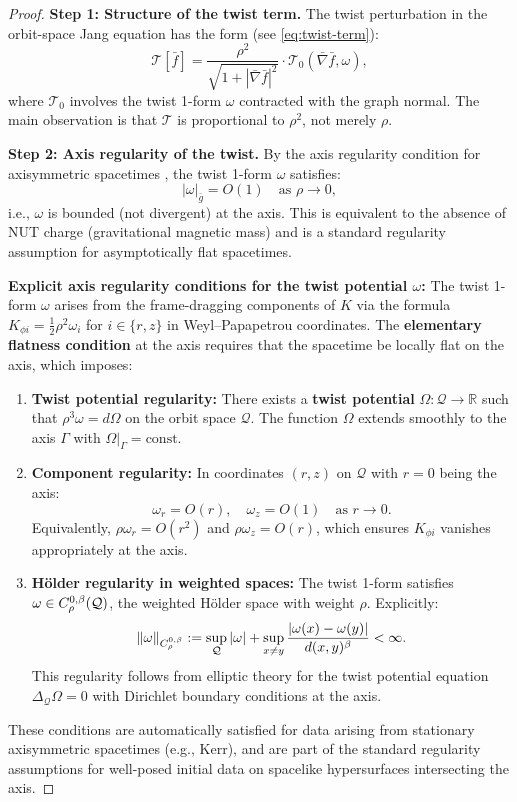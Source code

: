 \begin{proof}
\textbf{Step 1: Structure of the twist term.}
The twist perturbation in the orbit-space Jang equation has the form (see \eqref{eq:twist-term}):
\[
\mathcal{T}[\bar{f}] = \frac{\rho^2}{\sqrt{1 + |\bar{\nabla}\bar{f}|^2}} \cdot \mathcal{T}_0(\bar{\nabla}\bar{f}, \omega),
\]
where $\mathcal{T}_0$ involves the twist 1-form $\omega$ contracted with the graph normal. The main observation is that $\mathcal{T}$ is proportional to $\rho^2$, not merely $\rho$.

\textbf{Step 2: Axis regularity of the twist.}
By the axis regularity condition for axisymmetric spacetimes \cite[Chapter 7]{wald1984}, the twist 1-form $\omega$ satisfies:
\begin{equation}\label{eq:omega-axis-reg}
|\omega|_{\bar{g}} = O(1) \quad \text{as } \rho \to 0,
\end{equation}
i.e., $\omega$ is bounded (not divergent) at the axis. This is equivalent to the absence of NUT charge (gravitational magnetic mass) and is a standard regularity assumption for asymptotically flat spacetimes.

\textbf{Explicit axis regularity conditions for the twist potential $\omega$:}
The twist 1-form $\omega$ arises from the frame-dragging components of $K$ via the formula $K_{\phi i} = \frac{1}{2}\rho^2 \omega_i$ for $i \in \{r, z\}$ in Weyl--Papapetrou coordinates. The \textbf{elementary flatness condition} at the axis \cite[Section 7.1]{wald1984} requires that the spacetime be locally flat on the axis, which imposes:
\begin{enumerate}[label=\textup{(AR\arabic*)}]
    \item \textbf{Twist potential regularity:} There exists a \textbf{twist potential} $\Omega: \mathcal{Q} \to \mathbb{R}$ such that $\rho^3 \omega = d\Omega$ on the orbit space $\mathcal{Q}$. The function $\Omega$ extends smoothly to the axis $\Gamma$ with $\Omega|_\Gamma = \text{const}$.
    \item \textbf{Component regularity:} In coordinates $(r, z)$ on $\mathcal{Q}$ with $r = 0$ being the axis:
    \[
    \omega_r = O(r), \quad \omega_z = O(1) \quad \text{as } r \to 0.
    \]
    Equivalently, $\rho \omega_r = O(r^2)$ and $\rho \omega_z = O(r)$, which ensures $K_{\phi i}$ vanishes appropriately at the axis.
    \item \textbf{H\"older regularity in weighted spaces:} The twist 1-form satisfies $\omega \in C^{0,\beta}_{\rho}(\mathcal{Q})$, the weighted H\"older space with weight $\rho$. Explicitly:
    \[
    \|\omega\|_{C^{0,\beta}_\rho} := \sup_\mathcal{Q} |\omega| + \sup_{x \neq y} \frac{|\omega(x) - \omega(y)|}{d(x,y)^{\beta}} < \infty.
    \]
    This regularity follows from elliptic theory for the twist potential equation $\Delta_\mathcal{Q}\Omega = 0$ with Dirichlet boundary conditions at the axis.
\end{enumerate}
These conditions are automatically satisfied for data arising from stationary axisymmetric spacetimes (e.g., Kerr), and are part of the standard regularity assumptions for well-posed initial data on spacelike hypersurfaces intersecting the axis.


\end{proof}
